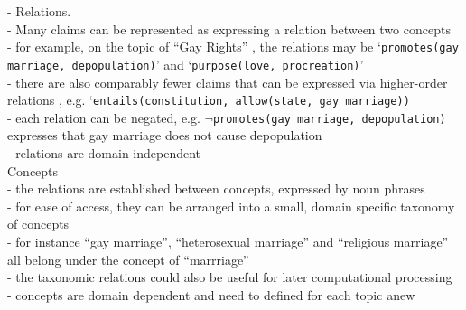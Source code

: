 \noindent - Relations.  \\
- Many claims can be represented as expressing a relation between two concepts \\
- for example, on the topic of ``Gay Rights'' , the relations may be 
`\texttt{promotes(gay marriage, depopulation)}' and 
`\texttt{purpose(love, procreation)}' \\
- there are also comparably fewer claims that can be expressed via
higher-order relations , e.g. `\texttt{entails(constitution, allow(state, gay marriage))} \\
- each relation can be negated, e.g. $\neg$\texttt{promotes(gay marriage, depopulation)} expresses
that gay marriage does not cause depopulation \\
- relations are domain independent \\

\noindent Concepts \\
- the relations are established between concepts, expressed by noun phrases \\
- for ease of access, they can be arranged into a small, domain specific taxonomy of concepts \\
- for instance ``gay marriage'', ``heterosexual marriage'' and ``religious marriage''
all belong under the concept of ``marrriage'' \\
- the taxonomic relations could also be useful for later computational processing \\
- concepts are domain dependent and need to defined for each topic anew \\

